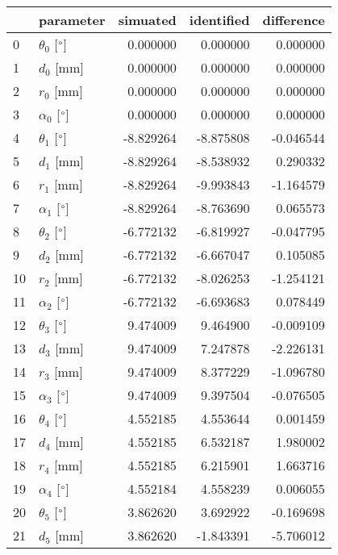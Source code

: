 \documentclass{standalone}%
\begin{document}
%
\normalsize%
\begin{tabular}{llrrr}
\toprule
{} &                 parameter &  simuated & identified & difference \\
\midrule
0  &  $\theta_{0}$ [$\degree$] &  0.000000 &   0.000000 &   0.000000 \\
1  &              $d_{0}$ [mm] &  0.000000 &   0.000000 &   0.000000 \\
2  &              $r_{0}$ [mm] &  0.000000 &   0.000000 &   0.000000 \\
3  &  $\alpha_{0}$ [$\degree$] &  0.000000 &   0.000000 &   0.000000 \\
4  &  $\theta_{1}$ [$\degree$] & -8.829264 &  -8.875808 &  -0.046544 \\
5  &              $d_{1}$ [mm] & -8.829264 &  -8.538932 &   0.290332 \\
6  &              $r_{1}$ [mm] & -8.829264 &  -9.993843 &  -1.164579 \\
7  &  $\alpha_{1}$ [$\degree$] & -8.829264 &  -8.763690 &   0.065573 \\
8  &  $\theta_{2}$ [$\degree$] & -6.772132 &  -6.819927 &  -0.047795 \\
9  &              $d_{2}$ [mm] & -6.772132 &  -6.667047 &   0.105085 \\
10 &              $r_{2}$ [mm] & -6.772132 &  -8.026253 &  -1.254121 \\
11 &  $\alpha_{2}$ [$\degree$] & -6.772132 &  -6.693683 &   0.078449 \\
12 &  $\theta_{3}$ [$\degree$] &  9.474009 &   9.464900 &  -0.009109 \\
13 &              $d_{3}$ [mm] &  9.474009 &   7.247878 &  -2.226131 \\
14 &              $r_{3}$ [mm] &  9.474009 &   8.377229 &  -1.096780 \\
15 &  $\alpha_{3}$ [$\degree$] &  9.474009 &   9.397504 &  -0.076505 \\
16 &  $\theta_{4}$ [$\degree$] &  4.552185 &   4.553644 &   0.001459 \\
17 &              $d_{4}$ [mm] &  4.552185 &   6.532187 &   1.980002 \\
18 &              $r_{4}$ [mm] &  4.552185 &   6.215901 &   1.663716 \\
19 &  $\alpha_{4}$ [$\degree$] &  4.552184 &   4.558239 &   0.006055 \\
20 &  $\theta_{5}$ [$\degree$] &  3.862620 &   3.692922 &  -0.169698 \\
21 &              $d_{5}$ [mm] &  3.862620 &  -1.843391 &  -5.706012 \\

\end{tabular}
\end{document}
